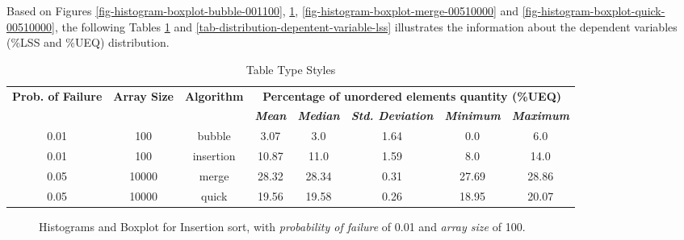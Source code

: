 Based on Figures \ref{fig-histogram-boxplot-bubble-001100}, \ref{fig-histogram-boxplot-insertion-001100}, \ref{fig-histogram-boxplot-merge-00510000} and \ref{fig-histogram-boxplot-quick-00510000}, the following Tables \ref{tab-distribution-depentent-variable-ueq} and \ref{tab-distribution-depentent-variable-lss} illustrates the information about the dependent variables (\%LSS and \%UEQ) distribution.

\begin{table}[H]
    \caption{Table Type Styles}
    \begin{center}
    \begin{tabular}{|c|c|c|c|c|c|c|c|}
    \hline
    \textbf{Prob. of Failure} & \textbf{Array Size} & \textbf{Algorithm} & \multicolumn{5}{|c|}{\textbf{Percentage of unordered elements quantity (\%UEQ)}} \\
    \cline{4-8} 
    & & & \textbf{\textit{Mean}}& \textbf{\textit{Median}} & \textbf{\textit{Std. Deviation}} & \textbf{\textit{Minimum}} & \textbf{\textit{Maximum}} \\
    \hline
    0.01 & 100 & bubble & 3.07 & 3.0 & 1.64 & 0.0 & 6.0 \\
    \hline
    0.01 & 100 & insertion & 10.87 & 11.0 & 1.59 & 8.0 & 14.0 \\
    \hline
    0.05 & 10000 & merge & 28.32 & 28.34 & 0.31 & 27.69 & 28.86 \\
    \hline
    0.05 & 10000 & quick & 19.56 & 19.58 & 0.26 & 18.95 & 20.07 \\
    \hline
    \end{tabular}
    \label{tab-distribution-depentent-variable-ueq}
    \end{center}
\end{table}

\begin{figure}[H]
    \centering
    \caption{Histograms and Boxplot for Insertion sort, with \textit{probability of failure} of 0.01 and \textit{array size} of 100.}
    \label{fig-histogram-boxplot-insertion-001100}
\end{figure}

